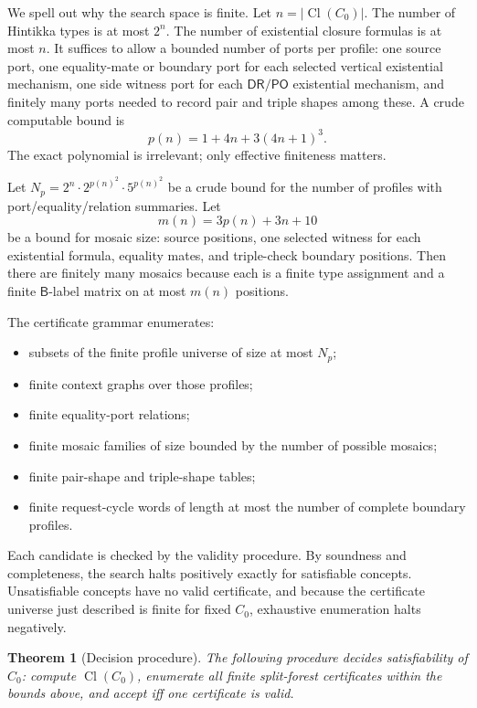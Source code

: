 \documentclass[11pt]{article}
\newtheorem{theorem}{Theorem}[section]
\newcommand{\Cl}{\operatorname{Cl}}
\newcommand{\Base}{\mathsf B}
\newcommand{\PO}{\mathsf{PO}}
\newcommand{\DR}{\mathsf{DR}}
\begin{document}
We spell out why the search space is finite.  Let \(n=|\Cl(C_0)|\).  The number of Hintikka types is at most \(2^n\).  The number of existential closure formulas is at most \(n\).  It suffices to allow a bounded number of ports per profile: one source port, one equality-mate or boundary port for each selected vertical existential mechanism, one side witness port for each \(\DR/\PO\) existential mechanism, and finitely many ports needed to record pair and triple shapes among these.  A crude computable bound is
\[
  p(n)=1+4n+3(4n+1)^3.
\]
The exact polynomial is irrelevant; only effective finiteness matters.

Let \(N_p=2^n\cdot 2^{p(n)^2}\cdot 5^{p(n)^2}\) be a crude bound for the number of profiles with port/equality/relation summaries.  Let
\[
  m(n)=3p(n)+3n+10
\]
be a bound for mosaic size: source positions, one selected witness for each existential formula, equality mates, and triple-check boundary positions.  Then there are finitely many mosaics because each is a finite type assignment and a finite \(\Base\)-label matrix on at most \(m(n)\) positions.

The certificate grammar enumerates:
\begin{itemize}
\item subsets of the finite profile universe of size at most \(N_p\);
\item finite context graphs over those profiles;
\item finite equality-port relations;
\item finite mosaic families of size bounded by the number of possible mosaics;
\item finite pair-shape and triple-shape tables;
\item finite request-cycle words of length at most the number of complete boundary profiles.
\end{itemize}
Each candidate is checked by the validity procedure.  By soundness and completeness, the search halts positively exactly for satisfiable concepts.  Unsatisfiable concepts have no valid certificate, and because the certificate universe just described is finite for fixed \(C_0\), exhaustive enumeration halts negatively.

\begin{theorem}[Decision procedure]
The following procedure decides satisfiability of \(C_0\): compute \(\Cl(C_0)\), enumerate all finite split-forest certificates within the bounds above, and accept iff one certificate is valid.
\end{theorem}
\end{document}
